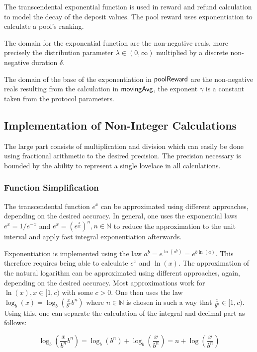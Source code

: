 The transcendental exponential function is used in reward and refund calculation
to model the decay of the deposit values. The pool reward uses exponentiation to
calculate a pool's ranking.

The domain for the exponential function are the non-negative reals, more
precisely the distribution parameter $\lambda \in (0, \infty)$ multiplied by a
discrete non-negative duration $\delta$.

The domain of the base of the exponentiation in $\mathsf{poolReward}$ are the
non-negative reals resulting from the calculation in $\mathsf{movingAvg}$, the
exponent $\gamma$ is a constant taken from the protocol parameters.

\subsection{Implementation of Non-Integer Calculations}
\label{sec:impl-non-integ}

The large part consists of multiplication and division which can easily be done
using fractional arithmetic to the desired precision. The precision necessary is
bounded by the ability to represent a single lovelace in all calculations.

\subsubsection{Function Simplification}
\label{sec:funct-simpl}

The transcendental function $e^{x}$ can be approximated using different
approaches, depending on the desired accuracy. In general, one uses the
exponential laws $e^{x} = 1/e^{-x}$ and
$e^{x} = \left(e^{\frac{x}{n}} \right)^{n}, n \in \mathbb{N}$ to reduce the
approximation to the unit interval and apply fast integral exponentiation
afterwards.

Exponentiation is implemented using the law
$a^{b} = e^{\ln(a^{b})}= e^{b\ln(a)}$. This therefore requires being able to
calculate $e^{x}$ and $\ln(x)$. The approximation of the natural logarithm can
be approximated using different approaches, again, depending on the desired
accuracy. Most approximations work for $\ln(x), x \in [1, c)$ with some $c >
0$. One then uses the law $\log_{b}(x) = \log_{b}(\frac{x}{b^{n}}b^{n})$ where
$n \in \mathbb{N}$ is chosen in such a way that $\frac{x}{b^{n}} \in [1,
c)$. Using this, one can separate the calculation of the integral and decimal
part as follows:

\begin{equation*}
  \log_{b}(\frac{x}{b^{n}}b^{n})=\log_{b}(b^{n}) + \log_{b}(\frac{x}{b^{n}})=
  n + \log(\frac{x}{b^{n}})
\end{equation*}

